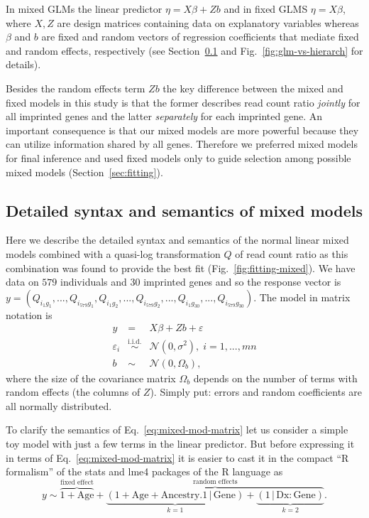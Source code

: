 \documentclass[letterpaper]{article}
\begin{document}
In mixed GLMs the linear predictor \(\eta = X
\beta + Z b\) and in fixed GLMS \(\eta = X \beta\), where \(X, Z\) are design
matrices containing data on explanatory variables whereas \(\beta \) and \(b\)
are fixed and random vectors of regression coefficients that mediate fixed and
random effects, respectively (see Section~\ref{sec:mixed-mod} and
Fig.~\ref{fig:glm-vs-hierarch} for 
details).

Besides the random effects term \(Zb\) the key difference between
the mixed and fixed models in this study is that the former describes
read count ratio \emph{jointly} for all imprinted genes and the latter
\emph{separately} for each imprinted gene.  An important consequence is that
our mixed models are more powerful because they can utilize 
information shared by all genes.  Therefore we preferred mixed models for final
inference and used fixed models only to guide selection among possible mixed
models (Section~\ref{sec:fitting}).

\subsection{Detailed syntax and semantics of mixed models}
\label{sec:mixed-mod}

Here we describe the detailed syntax and semantics of the normal linear mixed
models combined with a quasi-log transformation \(Q\) of read count ratio as
this combination was found to provide the best fit
(Fig.~\ref{fig:fitting-mixed}).  We have data
on \(579\) individuals and \(30\) imprinted genes and so the response vector is
\(y=(Q_{i_1g_1},...,Q_{i_{579}g_1},Q_{i_1g_2},...,Q_{i_{579}g_2},...,Q_{i_1g_{30}},...,Q_{i_{579}g_{30}})\).
The model in matrix notation is
\begin{eqnarray}
\label{eq:mixed-mod-matrix}
y &=& X \beta + Z b + \varepsilon \\
\varepsilon_i &\overset{\text{i.i.d.}}{\sim}& \mathcal{N}(0, \sigma^2),\;
i=1,...,mn \\
b &\sim& \mathcal{N}(0, \Omega_b),
\end{eqnarray}
where the size of the covariance matrix \(\Omega_b\) depends on the number of
terms with random effects (the columns of \(Z\)).  Simply put: errors and
random coefficients are all normally distributed.

To clarify the semantics of Eq.~\ref{eq:mixed-mod-matrix} let us consider a
simple toy model with just a few terms in the linear predictor.  But before
expressing it in terms of Eq.~\ref{eq:mixed-mod-matrix} it is easier
to cast it in the compact ``R formalism'' of the stats and lme4 packages of the R
language as
\begin{equation}
\label{eq:toy-mod-r}
y \sim \overbrace{1 + \mathrm{Age}}^{\text{fixed effect}} +
\overbrace{\underbrace{(1 + \mathrm{Age} + \mathrm{Ancestry.1} \,|\,
\mathrm{Gene})}_{k=1} +
\underbrace{(1 \,|\, \mathrm{Dx}:\mathrm{Gene})}_{k=2}}^{\text{random
effects}}.
\end{equation}
\end{document}
